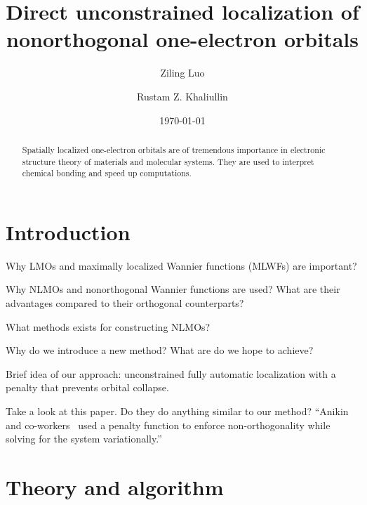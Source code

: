 \documentclass[aps,prl,reprint,amsmath,amssymb]{revtex4-1}
\begin{document}



\title{
Direct unconstrained localization of nonorthogonal one-electron orbitals
}

\author{Ziling Luo}
\author{Rustam Z. Khaliullin}

\date{\today}

\begin{abstract}
Spatially localized one-electron orbitals are of tremendous importance in electronic structure theory of materials and molecular systems. 
They are used to interpret chemical bonding and speed up computations. 
\end{abstract}

\maketitle

\section{Introduction} 

Why LMOs and maximally localized Wannier functions (MLWFs) are important?

Why NLMOs and nonorthogonal Wannier functions are used? What are their advantages compared to their orthogonal counterparts?

What methods exists for constructing NLMOs? 

Why do we introduce a new method? What are do we hope to achieve?

Brief idea of our approach: unconstrained fully automatic localization with a penalty that prevents orbital collapse.

Take a look at this paper. 
Do they do anything similar to our method? 
``Anikin and co-workers~\cite{anikin2004} used a penalty function to enforce non-orthogonality while solving for the system variationally.''


\section{Theory and algorithm}
\end{document}
